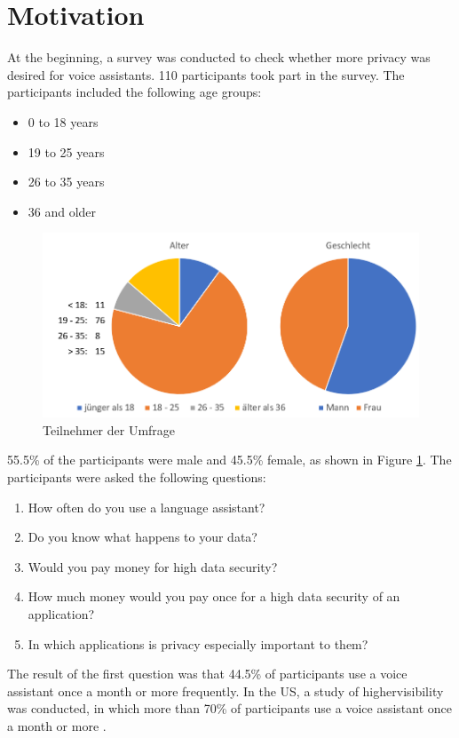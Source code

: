 \section{Motivation}\label{sec:motivaiton}
At the beginning, a survey was conducted to check whether more privacy was desired for voice assistants. 110 participants took part in the survey. The participants included the following age groups:
\begin{itemize}
	\item 0 to 18 years 
	\item 19 to 25 years
	\item 26 to 35 years
	\item 36 and older	
\end{itemize}

\begin{figure}[h]
	\centering
	\includegraphics[width=0.9\linewidth]{Picture/umfrage_teilnehmer}
	\caption[Teilnehmer der Umfrage]{Teilnehmer der Umfrage}
	\label{fig:umfrage_teilnehmer}
\end{figure}

55.5\% of the participants were male and 45.5\% female, as shown in Figure \ref{fig:umfrage_teilnehmer}. The participants were asked the following questions:

\begin{enumerate}	
	\item How often do you use a language assistant?
	\item Do you know what happens to your data?
	\item Would you pay money for high data security?
	\item How much money would you pay once for a high data security of an application?
	\item In which applications is privacy especially important to them?
\end{enumerate}

The result of the first question was that 44.5\% of participants use a voice assistant once a month or more frequently. In the US, a study of \glqq highervisibility\grqq{} was conducted, in which more than 70\% of participants use a voice assistant once a month or more \cite{highervisibility}.

